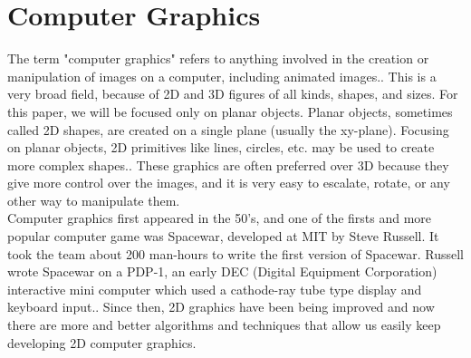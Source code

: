\documentclass[conference]{IEEEtran}
\begin{document}
\section{Computer Graphics}\justifying
    The term "computer graphics" refers to anything involved in the creation or manipulation
of images on a computer, including animated images.\cite{ComputerGraphics}. This is a very broad field, because of 2D and 3D figures of all kinds, shapes, and sizes. For this paper, we will be focused only on planar objects. Planar objects, sometimes called 2D shapes, are created on a single plane (usually the xy-plane). Focusing on planar objects, 2D primitives like lines, circles, etc. may be used to create more complex shapes.\cite{2DGraphics}. These graphics are often preferred over 3D because they give more control over the images, and it is very easy to escalate, rotate, or any other way to manipulate them.\\
Computer graphics first appeared in the 50's, and one of the firsts and more popular computer game was Spacewar, developed at MIT by Steve Russell. It took the team about 200 man-hours to write the first version of Spacewar. Russell wrote Spacewar on a PDP-1, an early DEC (Digital Equipment Corporation) interactive mini computer which used a cathode-ray tube type display and keyboard input.\cite{SpaceWar}. Since then, 2D graphics have been being improved and now there are more and better algorithms and techniques that allow us easily keep developing 2D computer graphics.
\end{document}
